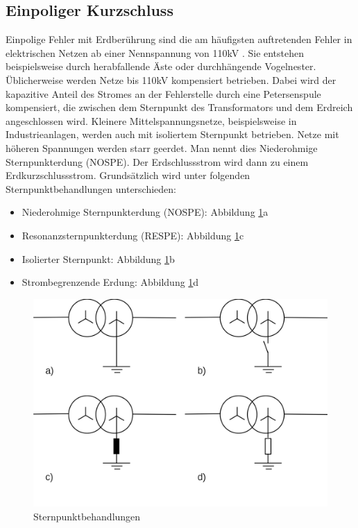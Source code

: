 \documentclass{scrartcl}
\begin{document}
\begin{onehalfspace}
\subsection{Einpoliger Kurzschluss}
Einpolige Fehler mit Erdberührung sind die am häufigsten auftretenden Fehler in elektrischen Netzen ab einer Nennspannung von 110kV \cite[S. 64]{Schlabbach2002}. Sie entstehen beispielsweise durch herabfallende Äste oder durchhängende Vogelnester. Üblicherweise werden Netze bis 110kV kompensiert betrieben. Dabei wird der kapazitive Anteil des Stromes an der Fehlerstelle durch eine Petersenspule kompensiert, die zwischen dem Sternpunkt des Transformators und dem Erdreich angeschlossen wird. Kleinere Mittelspannungsnetze, beispielsweise in Industrieanlagen, werden auch mit isoliertem Sternpunkt betrieben. Netze mit höheren Spannungen werden starr geerdet. Man nennt dies \glqq Niederohmige Sternpunkterdung\grqq{} (NOSPE). Der Erdschlussstrom wird dann zu einem Erdkurzschlussstrom. Grundsätzlich wird unter folgenden Sternpunktbehandlungen unterschieden:

\begin{itemize}
\item Niederohmige Sternpunkterdung (NOSPE): Abbildung \ref{sternpunktbehandlung}a
\item Resonanzsternpunkterdung (RESPE): Abbildung \ref{sternpunktbehandlung}c
\item Isolierter Sternpunkt: Abbildung \ref{sternpunktbehandlung}b
\item Strombegrenzende Erdung: Abbildung \ref{sternpunktbehandlung}d
\end{itemize}

	\begin{figure}[H]
	\centering
	\includegraphics[scale=0.3]{img/sternpunktbehandlung.png}
	\caption{Sternpunktbehandlungen}
	\label{sternpunktbehandlung}
	\end{figure}


\end{onehalfspace}
\end{document}
